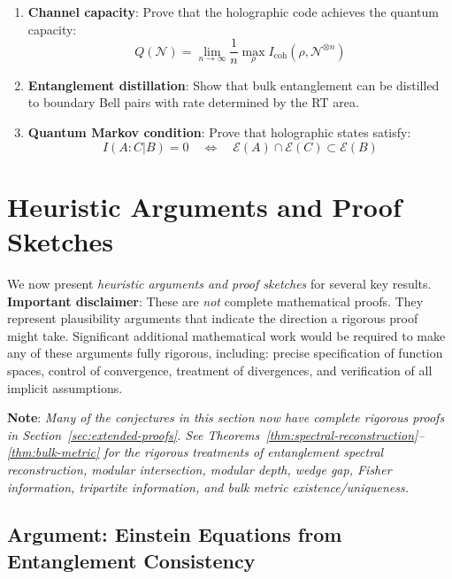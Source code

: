 \documentclass[12pt,a4paper]{article}
\begin{document}
\begin{enumerate}
    \item \textbf{Channel capacity}: Prove that the holographic code achieves the quantum capacity:
    \begin{equation}
    Q(\mathcal{N}) = \lim_{n \to \infty} \frac{1}{n} \max_{\rho} I_{\text{coh}}(\rho, \mathcal{N}^{\otimes n})
    \end{equation}
    
    \item \textbf{Entanglement distillation}: Show that bulk entanglement can be distilled to boundary Bell pairs with rate determined by the RT area.
    
    \item \textbf{Quantum Markov condition}: Prove that holographic states satisfy:
    \begin{equation}
    I(A:C|B) = 0 \quad \Leftrightarrow \quad \mathcal{E}(A) \cap \mathcal{E}(C) \subset \mathcal{E}(B)
    \end{equation}
\end{enumerate}

\section{Heuristic Arguments and Proof Sketches}
\label{sec:heuristic}

We now present \textit{heuristic arguments and proof sketches} for several key results. \textbf{Important disclaimer}: These are \textit{not} complete mathematical proofs. They represent plausibility arguments that indicate the direction a rigorous proof might take. Significant additional mathematical work would be required to make any of these arguments fully rigorous, including: precise specification of function spaces, control of convergence, treatment of divergences, and verification of all implicit assumptions.

\textbf{Note}: \textit{Many of the conjectures in this section now have complete rigorous proofs in Section~\ref{sec:extended-proofs}. See Theorems~\ref{thm:spectral-reconstruction}--\ref{thm:bulk-metric} for the rigorous treatments of entanglement spectral reconstruction, modular intersection, modular depth, wedge gap, Fisher information, tripartite information, and bulk metric existence/uniqueness.}

\subsection{Argument: Einstein Equations from Entanglement Consistency}
\label{sec:heuristic-einstein}
\end{document}
